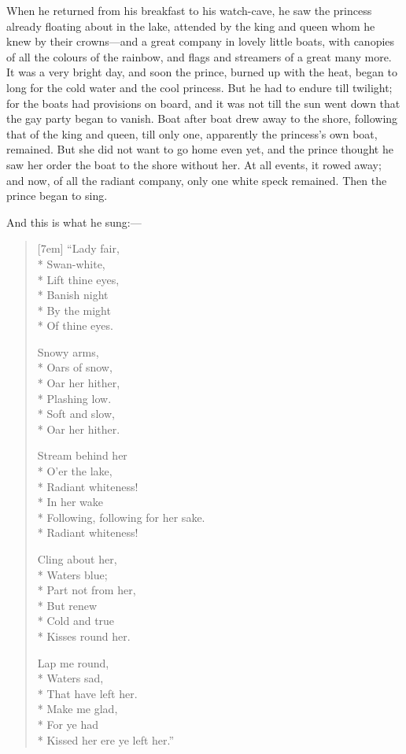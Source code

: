 \documentclass[12pt]{memoir}
\begin{document}
When he returned from his breakfast to his watch-cave, he saw the
princess already floating about in the lake, attended by the king and
queen whom he knew by their crowns---and a great company in lovely
little boats, with canopies of all the colours of the rainbow, and
flags and streamers of a great many more.  It was a very bright day,
and soon the prince, burned up with the heat, began to long for the
cold water and the cool princess.  But he had to endure till twilight;
for the boats had provisions on board, and it was not till the sun
went down that the gay party began to vanish.  Boat after boat drew
away to the shore, following that of the king and queen, till only
one, apparently the princess's own boat, remained.  But she did not
want to go home even yet, and the prince thought he saw her order the
boat to the shore without her.  At all events, it rowed away; and now,
of all the radiant company, only one white speck remained.  Then the
prince began to sing.

And this is what he sung:---

\begin{itshape}
\begin{verse}[7em]
``Lady fair,\\*
Swan-white,\\*
Lift thine eyes,\\*
Banish night\\*
By the might\\*
Of thine eyes.

Snowy arms,\\*
Oars of snow,\\*
Oar her hither,\\*
Plashing low.\\*
Soft and slow,\\*
Oar her hither.

Stream behind her\\*
O'er the lake,\\*
Radiant whiteness!\\*
In her wake\\*
Following, following for her sake.\\*
Radiant whiteness!

Cling about her,\\*
Waters blue;\\*
Part not from her,\\*
But renew\\*
Cold and true\\*
Kisses round her.

Lap me round,\\*
Waters sad,\\*
That have left her.\\*
Make me glad,\\*
For ye had\\*
Kissed her ere ye left her.''
\end{verse}
\end{itshape}
\end{document}
